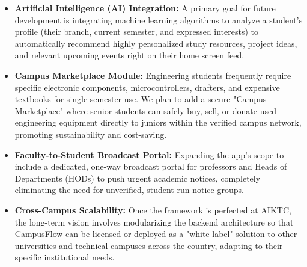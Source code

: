 \begin{itemize}
    \item \textbf{Artificial Intelligence (AI) Integration:} A primary goal for future development is integrating machine learning algorithms to analyze a student's profile (their branch, current semester, and expressed interests) to automatically recommend highly personalized study resources, project ideas, and relevant upcoming events right on their home screen feed.
    
    \item \textbf{Campus Marketplace Module:} Engineering students frequently require specific electronic components, microcontrollers, drafters, and expensive textbooks for single-semester use. We plan to add a secure "Campus Marketplace" where senior students can safely buy, sell, or donate used engineering equipment directly to juniors within the verified campus network, promoting sustainability and cost-saving.
    
    \item \textbf{Faculty-to-Student Broadcast Portal:} Expanding the app's scope to include a dedicated, one-way broadcast portal for professors and Heads of Departments (HODs) to push urgent academic notices, completely eliminating the need for unverified, student-run notice groups.
    
    \item \textbf{Cross-Campus Scalability:} Once the framework is perfected at AIKTC, the long-term vision involves modularizing the backend architecture so that CampusFlow can be licensed or deployed as a "white-label" solution to other universities and technical campuses across the country, adapting to their specific institutional needs.
\end{itemize}